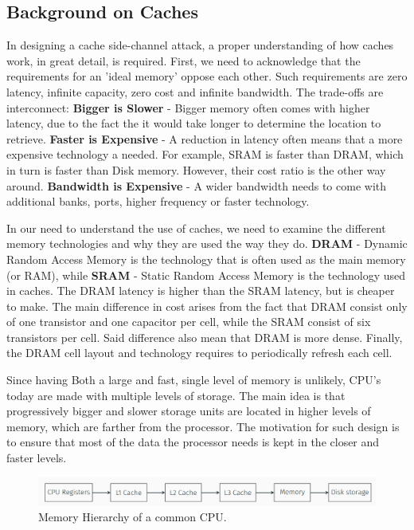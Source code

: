 \subsection{Background on Caches}
\label{subsec:backgroundoncaches}
In designing a cache side-channel attack, a proper understanding of how caches
work, in great detail, is required. First, we need to acknowledge that the
requirements for an 'ideal memory' oppose each other. Such requirements are zero
latency, infinite capacity, zero cost and infinite bandwidth. The trade-offs are
interconnect: \textbf{Bigger is Slower} - Bigger memory often comes with higher
latency, due to the fact the it would take longer to determine the location to
retrieve.  \textbf{Faster is Expensive} - A reduction in latency often means
that a more expensive technology a needed. For example, SRAM is faster than
DRAM, which in turn is faster than Disk memory. However, their cost ratio is the
other way around. \textbf{Bandwidth is Expensive} - A wider bandwidth needs to
come with additional banks, ports, higher frequency or faster technology. 

In our need to understand the use of caches, we need to examine the different
memory technologies and why they are used the way they do. \textbf{DRAM} -
Dynamic Random Access Memory is the technology that is often used as the main
memory (or RAM), while \textbf{SRAM} - Static Random Access Memory is the
technology used in caches. The DRAM latency is higher than the SRAM latency, but
is cheaper to make. The main difference in cost arises from the fact that DRAM
consist only of one transistor and one capacitor per cell, while the SRAM
consist of six transistors per cell. Said difference also mean that DRAM is more
dense. Finally, the DRAM cell layout and technology requires to periodically
refresh each cell.

Since having Both a large and fast, single level of memory is unlikely, CPU's
today are made with multiple levels of storage. The main idea is that
progressively bigger and slower storage units are located in higher levels of
memory, which are farther from the processor. The motivation for such design is
to ensure that most of the data the processor needs is kept in the closer and
faster levels.

\begin{figure}
    \centering
    \includegraphics[width=\textwidth]{images/chapter_6/MemHier.PNG}
    \caption{Memory Hierarchy of a common CPU.}
    \label{fig:MemHier}
\end{figure}

